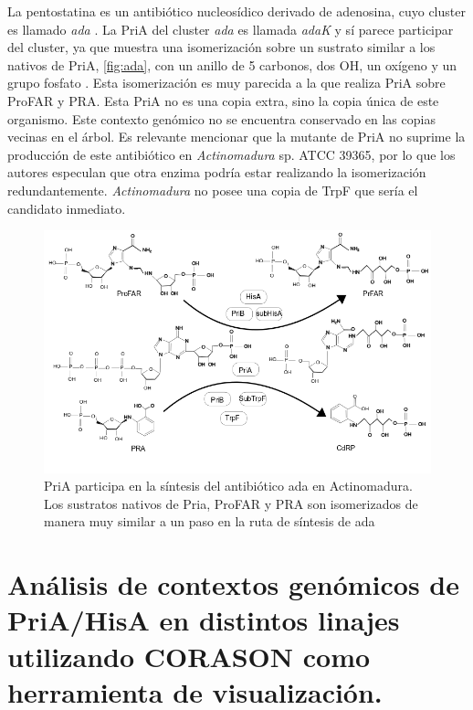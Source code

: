 \documentclass[12pt,twoside]{reedthesis}
\begin{document}
  La pentostatina es un antibiótico nucleosídico derivado de adenosina,
  cuyo cluster es llamado \emph{ada} . La PriA del cluster \emph{ada} es
  llamada \emph{adaK} y sí parece participar del cluster, ya que muestra
  una isomerización sobre un sustrato similar a los nativos de PriA,
  \autoref{fig:ada}, con un anillo de 5 carbonos, dos OH, un oxígeno y un
  grupo fosfato . Esta isomerización es muy parecida a la que realiza PriA
  sobre ProFAR y PRA. Esta PriA no es una copia extra, sino la copia única
  de este organismo. Este contexto genómico no se encuentra conservado en
  las copias vecinas en el árbol. Es relevante mencionar que la mutante de
  PriA no suprime la producción de este antibiótico en \emph{Actinomadura}
  sp. ATCC 39365, por lo que los autores especulan que otra enzima podría
  estar realizando la isomerización redundantemente. \emph{Actinomadura}
  no posee una copia de TrpF que sería el candidato inmediato.
  
  \begin{figure}[h!tbp]
  \centering
  \includegraphics[angle = 0,scale = 0.6]{chapter4/ada.png}
  \caption[PriA participa en la síntesis del antibiótico {ada} en {Actinomadura} ]{\footnotesize{PriA participa en la síntesis del antibiótico {ada} en {Actinomadura}. Los sustratos nativos de Pria, ProFAR y PRA son isomerizados de manera muy similar a un paso en la ruta de síntesis de {ada} }}
  \label{fig:ada}
  \end{figure}
  
  \clearpage
  
  \section{Análisis de contextos genómicos de PriA/HisA en distintos
  linajes utilizando CORASON como herramienta de
  visualización.}\label{analisis-de-contextos-genomicos-de-priahisa-en-distintos-linajes-utilizando-corason-como-herramienta-de-visualizacion.}
  
\end{document}
